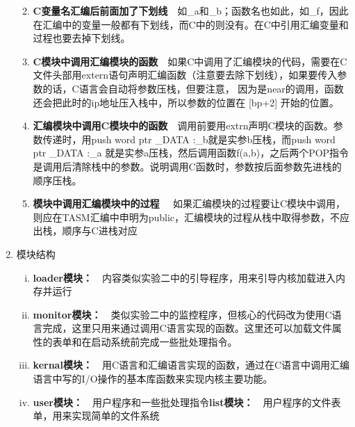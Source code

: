 \documentclass[UTF8]{article}
\begin{document}
\begin{enumerate}[1)]
\begin{enumerate}[i]
		\setlength{\itemsep}{0.2ex}
		\vspace{-0.2cm}
			\item {\bfseries{C变量名汇编后前面加了下划线}}\ \ 如\_a和\_b；函数名也如此，如\_f，因此在汇编中的变量一般都有下划线，而C中的则没有。在C中引用汇编变量和过程也要去掉下划线。
			\item {\bfseries{C模块中调用汇编模块的函数}}\ \ 如果C中调用了汇编模块的代码，需要在C文件头部用extern语句声明汇编函数（注意要去除下划线），如果要传入参数的话，C语言会自动将参数压栈，但要注意，{\color{red} 因为是near的调用，函数还会把此时的ip地址压入栈中，所以参数的位置在 [bp+2] 开始的位置}。
			\item {\bfseries{汇编模块中调用C模块中的函数}}\ \ 调用前要用extrn声明C模块的函数。参数传递时，用push	word ptr \_DATA :\_b就是实参b压栈，而push word ptr \_DATA :\_a 就是实参a压栈，然后调用函数f(a,b)，之后两个POP指令是调用后清除栈中的参数。说明调用C函数时，参数按后面参数先进栈的顺序压栈。
			\item {\bfseries{模块中调用汇编模块中的过程
}}\ \ 如果汇编模块的过程要让C模块中调用，则应在TASM汇编中申明为public，汇编模块的过程从栈中取得参数，不应出栈，顺序与C进栈对应
		\end{enumerate}
	\item 模块结构
		\begin {enumerate}[i)]
		\setlength{\itemsep}{0.2ex}
		\vspace{-0.2cm}
			\item {\bfseries{loader模块：}}\ \ 内容类似实验二中的引导程序，用来引导内核加载进入内存并运行
			\item {\bfseries{monitor模块：}}\ \ 类似实验二中的监控程序，但核心的代码改为使用C语言完成，这里只用来通过调用C语言实现的函数。这里还可以加载文件属性的表单和在启动系统前完成一些批处理指令。
			\item {\bfseries{kernal模块：}}\ \ 用C语言和汇编语言实现的函数，通过在C语言中调用汇编语言中写的I/O操作的基本库函数来实现内核主要功能。
			\item {\bfseries{user模块：}}\ \ 用户程序和一些批处理指令{\bfseries{list模块：}}\ \ 用户程序的文件表单，用来实现简单的文件系统
		\end{enumerate}
\end{enumerate}
\end{document}
